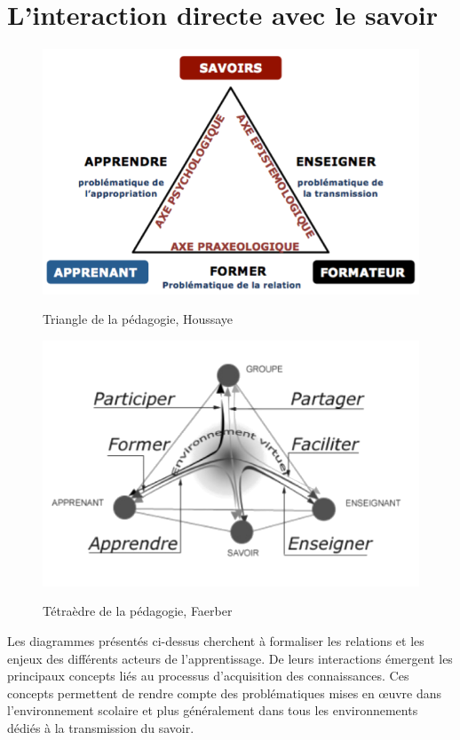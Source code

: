 \section{L'interaction directe avec le savoir}\label{sec:mooc}
        \begin{figure}[!h]
          \begin{minipage}{0.45\linewidth}
              \centering
              \label{fig:triangle}\includegraphics[width=\linewidth]{Figures/Houssaye-triangle.png}
              \caption{Triangle de la pédagogie, Houssaye~}
          \end{minipage}
          \hfill
          \begin{minipage}{0.45\linewidth}
              \centering
              \label{fig:tetra}\includegraphics[width=\linewidth]{Figures/Faerber-tetra.png}
              \caption{Tétraèdre de la pédagogie, Faerber~}
          \end{minipage}
          \hfill
        \end{figure}\par%
        Les diagrammes présentés ci-dessus cherchent à formaliser les relations et les enjeux des différents acteurs de l'apprentissage. De leurs interactions émergent les principaux concepts liés au processus d'acquisition des connaissances. Ces concepts permettent de rendre compte des problématiques mises en œuvre dans l'environnement scolaire et plus généralement dans tous les environnements dédiés à la transmission du savoir. 
